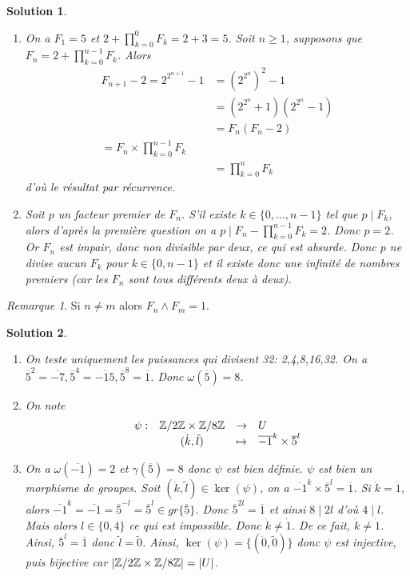 \documentclass[12pt]{article}
\newtheorem{solution}{Solution}[section]
\theoremstyle{remark}
\newtheorem{remark}{Remarque}[section]
\newcommand{\function}[5]{
	$$
	\begin{array}{rccl}
		#1: & #2 & \to & #3 \\
		& #4 & \mapsto & #5
	\end{array}
	$$
}
\numberwithin{equation}{section}
\begin{document}
\begin{solution}
	\phantom{}
	\begin{enumerate}
		\item On a $F_{1}=5$ et $2+\prod_{k=0}^{0}F_{k}=2+3=5$. Soit $n\geqslant1$, supposons que $F_{n}=2+\prod_{k=0}^{n-1}F_{k}$. Alors 
		\begin{align*}
			F_{n+1}-2=2^{2^{n+1}}-1
			&=(2^{2^{n}})^{2}-1\\
			&=(2^{2^{n}}+1)(2^{2^{n}}-1)\\
			&=F_{n}(F_{n}-2)\\
			=F_{n}\times\prod_{k=0}^{n-1}F_{k}\\
			&=\prod_{k=0}^{n}F_{k}
		\end{align*}
		d'où le résultat par récurrence.

		\item Soit $p$ un facteur premier de $F_{n}$. S'il existe $k\in\{0,\dots,n-1\}$ tel que $p\mid F_{k}$, alors d'après la première question on a $p\mid F_{n}-\prod_{k=0}^{n-1}F_{k}=2$. Donc $p=2$. Or $F_{n}$ est impair, donc non divisible par deux, ce qui est absurde. Donc $p$ ne divise aucun $F_{k}$ pour $k\in\{0,n-1\}$ et il existe donc une infinité de nombres premiers (car les $F_{n}$ sont tous différents deux à deux).
	\end{enumerate}
\end{solution}

\begin{remark}
	Si $n\neq m$ alors $F_{n}\wedge F_{m}=1$.
\end{remark}

\begin{solution}
	\phantom{}
	\begin{enumerate}
		\item On teste uniquement les puissances qui divisent 32: 2,4,8,16,32. On a $\overline{5}^{2}=\overline{-7},\overline{5}^{4}=\overline{-15},\overline{5}^{8}=\overline{1}$. Donc $\omega(\overline{5})=8$.
		\item On note \function{\psi}{\Z/2\Z\times\Z/8\Z}{U}{(\dot{k},\tilde{l})}{\overline{-1}^{k}\times\overline{5}^{l}}
		\item On a $\omega(\overline{-1})=2$ et $\gamma(\overline{5})=8$ donc $\psi$ est bien définie. $\psi$ est bien un morphisme de groupes. Soit $(\dot{k},\tilde{l})\in\ker(\psi)$, on a $\overline{-1}^{k}\times \overline{5}^{l}=\overline{1}$. Si $\dot{k}=\dot{1}$, alors $\overline{-1}^{k}=\overline{-1}=\overline{5}^{-l}=\overline{5}^{l}\in gr\{\overline{5}\}$. Donc $\overline{5}^{2l}=\overline{1}$ et ainsi $8\mid 2l$ d'où $4\mid l$. Mais alors $l\in\{0,4\}$ ce qui est impossible. Donc $\dot{k}\neq\dot{1}$. De ce fait, $\dot{k}\neq\dot{1}$. Ainsi, $\overline{5}^{l}=\overline{1}$ donc $\tilde{l}=\tilde{0}$. Ainsi, $\ker(\psi)=\{(\dot{0},\tilde{0})\}$ donc $\psi$ est injective, puis bijective car $\vert\mathbb{Z}/2\mathbb{Z}\times\mathbb{Z}/8\mathbb{Z}\vert=\vert U\vert$.
	\end{enumerate}
\end{solution}
\end{document}

